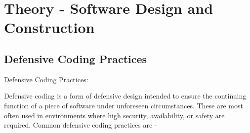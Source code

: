 \documentclass{article}
\begin{document}
\newpage
\section{Theory - Software Design and Construction}

\subsection{Defensive Coding Practices} 

    Defensive Coding Practices:
    
    Defensive coding is a form of defensive design intended to ensure the continuing function of a piece of software under unforeseen circumstances. These are most often used in environments where high security, availability, or safety are required.\cite{adams_2017}
    Common defensive coding practices are \cite{hack2secure} - 
\end{document}
